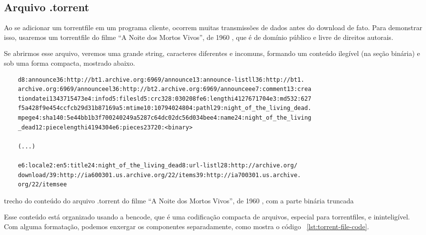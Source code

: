 
\newpage
\subsection*{Arquivo .torrent}

Ao se adicionar um \gls*{torrentfile} em um programa cliente, ocorrem muitas
transmissões de dados antes do download de fato. Para demonstrar isso, usaremos um
\gls*{torrentfile} do filme \enquote{A Noite dos Mortos Vivos}, de 1960
\cite{torrent-file}, que é de domínio público e livre de direitos autorais.

Se abrirmos esse arquivo, veremos uma grande \gls{string}, caracteres diferentes e
incomuns, formando um conteúdo ilegível (na seção binária) e sob uma forma compacta,
mostrado abaixo.

\begin{listing}[H]
    \begin{verbatim}
    d8:announce36:http://bt1.archive.org:6969/announce13:announce-listll36:http://bt1.
    archive.org:6969/announceel36:http://bt2.archive.org:6969/announceee7:comment13:crea
    tiondatei1343715473e4:infod5:filesld5:crc328:030208fe6:lengthi4127671704e3:md532:627
    f5a428f9e454ccfcb29d31b87169a5:mtime10:10794024804:pathl29:night_of_the_living_dead.
    mpege4:sha140:5e44bb1b3f700240249a5287c64dc02dc56d034bee4:name24:night_of_the_living
    _dead12:piecelengthi4194304e6:pieces23720:<binary>

    (...)

    e6:locale2:en5:title24:night_of_the_living_dead8:url-listl28:http://archive.org/
    download/39:http://ia600301.us.archive.org/22/items39:http://ia700301.us.archive.
    org/22/itemsee
    \end{verbatim}

    \caption{trecho do conteúdo do arquivo .torrent do filme \enquote{A Noite dos Mortos
    Vivos}, de 1960 \cite{torrent-file}, com a parte binária truncada}
    \label{lst:torrent-file-raw}
\end{listing}

Esse conteúdo está organizado usando a \gls{bencode}, que é uma codificação compacta de
arquivos, especial para \glspl*{torrentfile}, e ininteligível. Com alguma formatação,
podemos enxergar os componentes separadamente, como mostra o código
~\ref{lst:torrent-file-code}.

